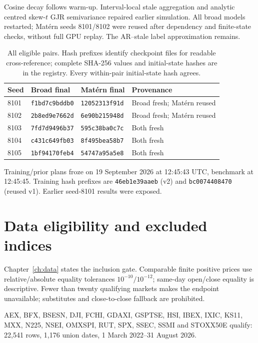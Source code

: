 Cosine decay follows warm-up. Interval-local stale aggregation and analytic centred skew-$t$ GJR semivariance repaired earlier simulation. All broad models restarted; Mat\'ern seeds 8101/8102 were reused after dependency and finite-state checks, without full GPU replay. The AR--stale label approximation remains.

\begin{table}[htbp]
\centering\small
\caption[Five-pair checkpoint provenance]{All eligible pairs. Hash prefixes identify checkpoint files for readable cross-reference; complete SHA-256 values and initial-state hashes are in the registry. Every within-pair initial-state hash agrees.}
\label{tab:closure_provenance}
\begin{tabular}{@{}lp{4.2cm}p{4.2cm}p{3.5cm}@{}}
\toprule Seed & Broad final & Mat\'ern final & Provenance \\
\midrule
8101 & \texttt{f1bd7c9bddb0} & \texttt{12052313f91d} & Broad fresh; Mat\'ern reused \\
8102 & \texttt{2b8ed9e7662d} & \texttt{6e90b215948d} & Broad fresh; Mat\'ern reused \\
8103 & \texttt{7fd7d9496b37} & \texttt{595c38ba0c7c} & Both fresh \\
8104 & \texttt{c431c649fb03} & \texttt{8f495bea58b7} & Both fresh \\
8105 & \texttt{1bf94170feb4} & \texttt{54747a95a5e8} & Both fresh \\
\bottomrule
\end{tabular}
\end{table}

Training/prior plans froze on 19 September 2026 at 12:45:43 UTC, benchmark at 12:45:45. Training hash prefixes are \texttt{46eb1e39aaeb} (v2) and \texttt{bc0074408470} (reused v1). Earlier seed-8101 results were exposed.

\section{Data eligibility and excluded indices}

Chapter~\ref{ch:data} states the inclusion gate. Comparable finite positive prices use relative/absolute equality tolerances $10^{-10}/10^{-12}$; same-day open/close equality is descriptive. Fewer than twenty qualifying markets makes the endpoint unavailable; substitutes and close-to-close fallback are prohibited.

AEX, BFX, BSESN, DJI, FCHI, GDAXI, GSPTSE, HSI, IBEX, IXIC, KS11, MXX, N225, NSEI, OMXSPI, RUT, SPX, SSEC, SSMI and STOXX50E qualify: 22,541 rows, 1,176 union dates, 1 March 2022--31 August 2026.

